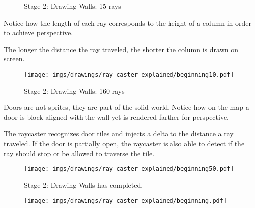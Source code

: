 \begin{figure}[H]
 \centering
  \caption{Stage 2: Drawing Walls: 15 rays} 
\end{figure}
\begin{minipage}{.4\textwidth}
Notice how the length of each ray corresponds to the height of a column in order to achieve perspective.\\
\par
The longer the distance the ray traveled, the shorter the column is drawn on screen.
 \end{minipage}
\begin{minipage}{.6\textwidth}
\begin{figure}[H]
  \centering
 \texttt{[image: imgs/drawings/ray\_caster\_explained/beginning10.pdf]}
   
\end{figure}
\end{minipage}




 
\begin{figure}[H]
 \centering
 \caption{Stage 2: Drawing Walls: 160 rays}  
\end{figure}
 \begin{minipage}{.4\textwidth}
 Doors are not sprites, they are part of the solid world. Notice how on the map a door is block-aligned with the wall yet is rendered farther for perspective.\\
 \par
 The raycaster recognizes door tiles and injects a delta to the distance a ray traveled. If the door is partially open, the raycaster is also able to detect if the ray should stop or be allowed to traverse the tile.
 \end{minipage}
\begin{minipage}{.6\textwidth}
\begin{figure}[H]
  \centering
 \texttt{[image: imgs/drawings/ray\_caster\_explained/beginning50.pdf]}
   
\end{figure}
\end{minipage}



 
 \begin{figure}[H]
\centering
 \caption{Stage 2: Drawing Walls has completed.} 
 \end{figure}
\begin{minipage}{\textwidth}
\begin{figure}[H]
  \centering
 \texttt{[image: imgs/drawings/ray\_caster\_explained/beginning.pdf]}
   
\end{figure}
\end{minipage}




